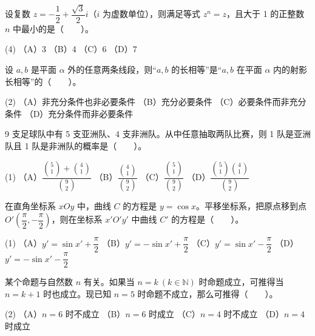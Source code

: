 \begin{question}
设复数 \(z=-\dfrac12+\dfrac{\sqrt3}{2}i\)（\(i\) 为虚数单位），则满足等式 \(z^n=z\)，且大于 1 的正整数 \(n\) 中最小的是\mbox{（　　）}。

\begin{gkopts}(4)
\task （A）3
\task （B）4
\task （C）6
\task （D）7
\end{gkopts}

\end{question}
\begin{question}
设 \(a,b\) 是平面 \(\alpha\) 外的任意两条线段，则“\(a,b\) 的长相等”是“\(a,b\) 在平面 \(\alpha\) 内的射影长相等”的\mbox{（　　）}。

\begin{gkopts}(2)
\task （A）非充分条件也非必要条件
\task （B）充分必要条件
\task （C）必要条件而非充分条件
\task （D）充分条件而非必要条件
\end{gkopts}

\end{question}
\begin{question}
9 支足球队中有 5 支亚洲队、4 支非洲队。从中任意抽取两队比赛，则 1 队是亚洲队且 1 队是非洲队的概率是\mbox{（　　）}。

\begin{gkopts}(1)
\task （A）\(\dfrac{\binom51+\binom41}{\binom92}\)
\task （B）\(\dfrac{\binom41}{\binom92}\)
\task （C）\(\dfrac{\binom51}{\binom92}\)
\task （D）\(\dfrac{\binom51\binom41}{\binom92}\)
\end{gkopts}

\end{question}
\begin{question}
在直角坐标系 \(xOy\) 中，曲线 \(C\) 的方程是 \(y=\cos x\)。平移坐标系，把原点移到点 \(O\prime\left(\dfrac\pi2,-\dfrac\pi2\right)\)，则在坐标系 \(x\prime O\prime y\prime\) 中曲线 \(C\prime\) 的方程是\mbox{（　　）}。

\begin{gkopts}(1)
\task （A）\(y'=\sin x'+\dfrac\pi2\)
\task （B）\(y'=-\sin x'+\dfrac\pi2\)
\task （C）\(y'=\sin x'-\dfrac\pi2\)
\task （D）\(y'=-\sin x'-\dfrac\pi2\)
\end{gkopts}

\end{question}
\begin{question}
某个命题与自然数 \(n\) 有关。如果当 \(n=k\ (k\in\mathbb N)\) 时命题成立，可推得当 \(n=k+1\) 时也成立。现已知 \(n=5\) 时命题不成立，那么可推得\mbox{（　　）}。

\begin{gkopts}(2)
\task （A）\(n=6\) 时不成立
\task （B）\(n=6\) 时成立
\task （C）\(n=4\) 时不成立
\task （D）\(n=4\) 时成立
\end{gkopts}

\end{question}

